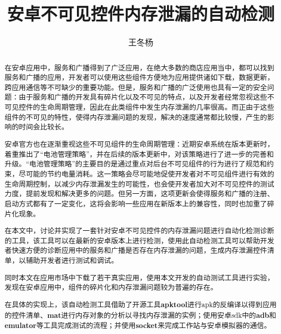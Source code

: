 \documentclass[winfonts]{njuthesis}
\title{安卓不可见控件内存泄漏的自动检测}
\author{王冬杨}
\begin{document}
\maketitle

\begin{abstract}

在安卓应用中，服务和广播得到了广泛应用，在绝大多数的商店应用当中，都可以找到服务和广播的应用，开发者可以使用这些组件方便地为应用提供诸如下载，数据更新，跨应用通信等不可缺少的重要功能。但是，服务和广播的广泛使用也具有一定的安全问题：由于服务和广播的开发具有碎片化以及不可见的特点，以及开发者经常忽视这些不可见控件的生命周期管理，因此在此类组件中发生内存泄漏的几率很高。而正由于这些组件的不可见的特性，使得内存泄漏问题的发现，解决的速度通常都比较慢，产生的影响的时间会比较长。

安卓官方也在逐渐重视这些不可见组件的生命周期管理：近期安卓系统在版本更新时，着重推出了“电池管理策略”，并在后续的版本更新中，对该策略进行了进一步的完善和升级。“电池管理策略”的主要目的是通过重点对后台不可见组件的行为进行了规范和约束，尽可能的节约电量消耗。这一策略会尽可能地促使开发者对不可见组件进行有效的生命周期控制，以减少内存泄漏发生的可能性，也会使开发者加大对不可见控件的测试力度，提前发现和解决更多的问题。但另一方面，这项更新会使得服务和广播的注册、启动方式都有了一定变化，这将会影响一些应用在新版本上的兼容性，同时也加重了碎片化现象。

在本文中，讨论并实现了一套针对安卓不可见控件的内存泄漏问题进行自动化检测诊断的工具，该工具可以在最新的安卓版本上进行检测，使用此自动检测工具可以帮助开发者快速方便的诊断应用中的服务和广播是否存在内存泄漏的问题，生成内存泄漏控件清单，以辅助开发者进行测试和调试。

同时本文在应用市场中下载了若干真实应用，使用本文开发的自动测试工具进行实验，发现在安卓应用中，组件的碎片化和内存泄漏问题较为普遍的存在。

在具体的实现上，该自动检测工具借助了开源工具\textbf{apktool}\cite{apktool}进行apk的反编译以得到应用的控件清单、\textbf{mat}\cite{mat}进行内存对象的分析以寻找内存泄漏的实例；使用安卓sdk中的\textbf{adb}和\textbf{emulator}等工具完成测试的流程；并使用\textbf{socket}来完成工作站与安卓模拟器的通信。

\end{abstract}
\end{document}
